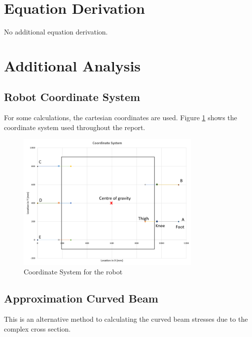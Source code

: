 \section{Equation Derivation} \label{app:eq_der}

No additional equation derivation.

\section{Additional Analysis} 
\subsection{Robot Coordinate System}
\label{app:coordinate}
For some calculations, the cartesian coordinates are used. Figure \ref{fig:coordinate_system} shows the coordinate system used throughout the report.
\begin{figure}[H]
    \centering
    \includegraphics[width=0.8\textwidth]{7_Appendices/Images/CoordinateSystem.PNG}
    \caption{Coordinate System for the robot}
    \label{fig:coordinate_system}
\end{figure}

\subsection{Approximation Curved Beam}\label{app:approximation_curved_beam}
This is an alternative method to calculating the curved beam stresses due to the complex cross section.

